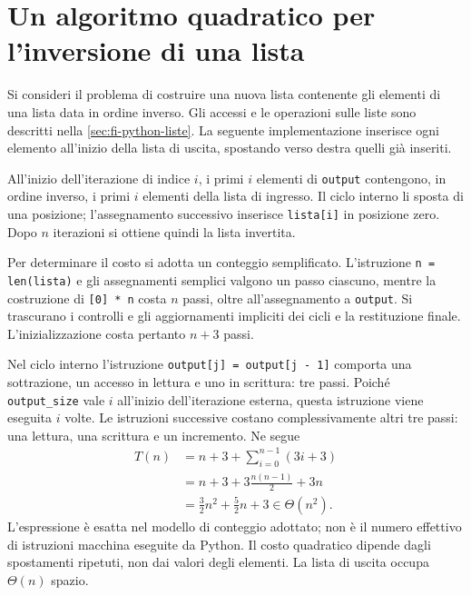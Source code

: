 \section{Un algoritmo quadratico per l'inversione di una lista}
\label{sec:fi-complessita-reverse-quadratico}

Si consideri il problema di costruire una nuova lista contenente gli
elementi di una lista data in ordine inverso. Gli accessi e le
operazioni sulle liste sono descritti nella \cref{sec:fi-python-liste}.
La seguente implementazione inserisce ogni elemento all'inizio della
lista di uscita, spostando verso destra quelli già inseriti.



All'inizio dell'iterazione di indice \(i\), i primi \(i\) elementi di
\texttt{output} contengono, in ordine inverso, i primi \(i\) elementi
della lista di ingresso. Il ciclo interno li sposta di una posizione;
l'assegnamento successivo inserisce \texttt{lista[i]} in posizione
zero. Dopo \(n\) iterazioni si ottiene quindi la lista invertita.

Per determinare il costo si adotta un conteggio semplificato.
L'istruzione
\texttt{n = len(lista)} e gli assegnamenti semplici valgono un passo
ciascuno, mentre la costruzione di \texttt{[0] * n} costa \(n\) passi,
oltre all'assegnamento a \texttt{output}. Si trascurano i controlli
e gli aggiornamenti impliciti dei cicli e la restituzione finale.
L'inizializzazione costa pertanto \(n+3\) passi.

Nel ciclo interno l'istruzione
\texttt{output[j] = output[j - 1]} comporta una sottrazione,
un accesso in lettura e uno in scrittura: tre passi. Poiché
\texttt{output\_size} vale \(i\) all'inizio dell'iterazione esterna,
questa istruzione viene eseguita \(i\) volte. Le istruzioni successive
costano complessivamente altri tre passi: una lettura, una scrittura e
un incremento. Ne segue
\begin{align*}
  T(n)
    &=n+3+\sum_{i=0}^{n-1}(3i+3)\\
    &=n+3+3\frac{n(n-1)}2+3n\\
    &=\frac32n^2+\frac52n+3
     \in\Theta(n^2).
\end{align*}
L'espressione è esatta nel modello di conteggio adottato; non è il
numero effettivo di istruzioni macchina eseguite da Python. Il costo
quadratico dipende dagli spostamenti ripetuti, non dai valori degli
elementi. La lista di uscita occupa \(\Theta(n)\) spazio.

